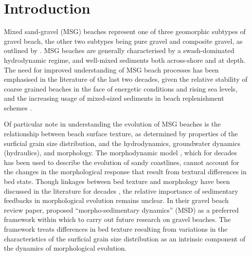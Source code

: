 \documentclass[preprint,12pt,authoryear]{elsarticle}
\begin{document}
\section{Introduction}\label{Introduction}

Mixed sand-gravel (MSG) beaches represent one of three geomorphic subtypes of gravel beach, the other two subtypes being pure gravel and composite gravel, as outlined by \citet{Jennings_Shulmeister2002}. MSG beaches are generally characterised by a swash-dominated hydrodynamic regime, and well-mixed sediments both across-shore and at depth. The need for improved understanding of MSG beach processes has been emphasised in the literature of the last two decades, given the relative stability of coarse grained beaches in the face of energetic conditions and rising sea levels, and the increasing usage of mixed-sized sediments in beach replenishment schemes \citep{Mason_Coates2001}. 


Of particular note in understanding the evolution of MSG beaches is the relationship between beach surface texture, as determined by properties of the surficial grain size distribution, and the hydrodynamics, groundwater dynamics (hydraulics), and morphology. The morphodynamic model \citep{Wright_Thom1977, Buscombe_Masselink2006}, which for decades has been used to describe the evolution of sandy coastlines, cannot account for the changes in the morphological response that result from textural differences in bed state. Though linkages between bed texture and morphology have been discussed in the literature for decades \citep[e.g.,][]{LonguetHiggins_Parkin1962, Moss1962, Isla1993, Carter_Orford1993, Sherman_etal1993, Masselink_Li2001, Buscombe_Masselink2006, Masselink_etal2007, Austin_Buscombe2008, VanGaalen_etal2011, Guest_Hay2019}, the relative importance of sedimentary feedbacks in morphological evolution remains unclear. In their gravel beach review paper, \citet{Buscombe_Masselink2006} proposed ``morpho-sedimentary dynamics'' (MSD) as a preferred framework within which to carry out future research on gravel beaches. The framework treats differences in bed texture resulting from variations in the characteristics of the surficial grain size distribution as an intrinsic component of the dynamics of morphological evolution. 

\end{document}
